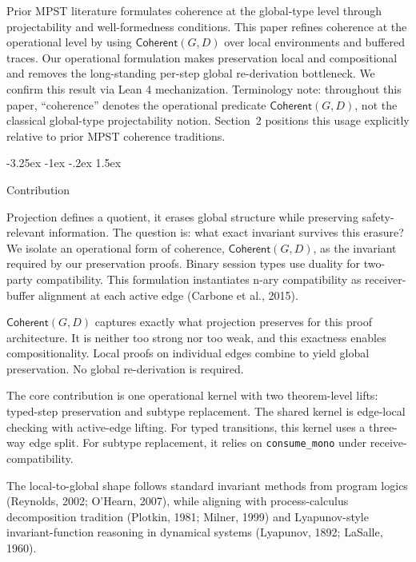 \documentclass[a4paper,10pt,twocolumn,english]{article}
\makeatletter
\renewcommand{\subsection}{\@startsection{subsection}{2}{\z@}%
  {-3.25ex \@plus -1ex \@minus -.2ex}%
  {1.5ex}%
  {\raggedright\normalfont\normalsize\bfseries}}
\numberwithin{equation}{section}
\theoremstyle{paperdef}
\theoremstyle{paperplain}
\theoremstyle{paperdef}
\theoremstyle{paperremark}
\newcommand{\Coherent}{\ensuremath{\mathsf{Coherent}}}
\makeatother
\begin{document}
Prior MPST literature formulates coherence at the global-type level through projectability and
well-formedness conditions. This paper refines coherence at the operational level by using
$\Coherent(G,D)$ over local environments and buffered traces. Our operational formulation makes
preservation local and compositional and removes the long-standing per-step global re-derivation
bottleneck. We confirm this result via Lean 4 mechanization.
Terminology note: throughout this paper, ``coherence'' denotes the operational predicate
$\Coherent(G,D)$, not the classical global-type projectability notion. Section~2 positions this
usage explicitly relative to prior MPST coherence traditions.

\subsection{Contribution}

Projection defines a quotient, it erases global structure while preserving safety-relevant information.
The question is: what exact invariant survives this erasure? We isolate an operational form of
coherence, $\Coherent(G,D)$, as the invariant required by our preservation proofs.
Binary session types use duality for two-party compatibility. This formulation instantiates n-ary
compatibility as receiver-buffer alignment at each active edge (Carbone et al., 2015).

$\Coherent(G,D)$ captures exactly what projection preserves for this proof architecture. It is
neither too strong nor too weak, and this exactness enables compositionality. Local proofs on individual
edges combine to yield global preservation. No global re-derivation is required.

The core contribution is one operational kernel with two theorem-level lifts: typed-step preservation
and subtype replacement. The shared kernel is edge-local checking with active-edge lifting.
For typed transitions, this kernel uses a three-way edge split.
For subtype replacement, it relies on \nolinkurl{consume_mono} under receive-compatibility.

The local-to-global shape follows standard invariant methods from program logics (Reynolds, 2002;
O'Hearn, 2007), while aligning with process-calculus decomposition tradition (Plotkin, 1981;
Milner, 1999) and Lyapunov-style invariant-function reasoning in dynamical systems (Lyapunov, 1892;
LaSalle, 1960).
\end{document}
